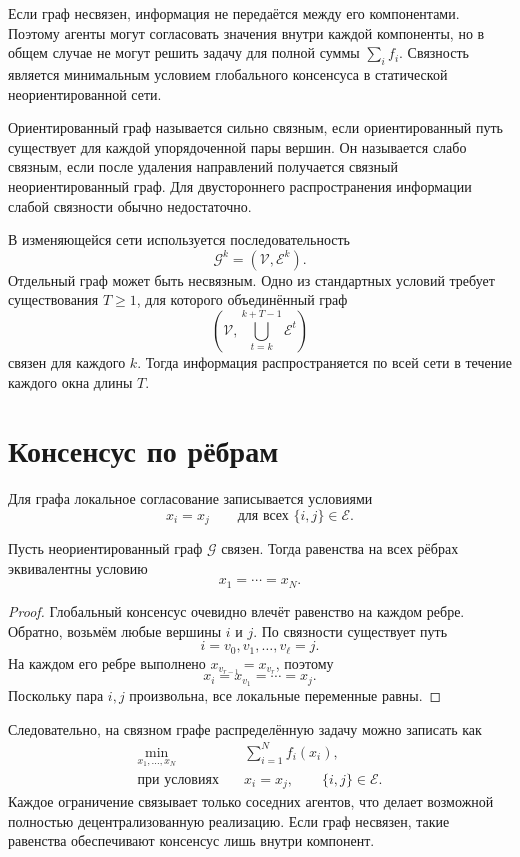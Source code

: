 Если граф несвязен, информация не передаётся между его компонентами.
Поэтому агенты могут согласовать значения внутри каждой компоненты,
но в общем случае не могут решить задачу для полной суммы
\(\sum_i f_i\). Связность является минимальным условием глобального
консенсуса в статической неориентированной сети.

Ориентированный граф называется сильно связным, если ориентированный
путь существует для каждой упорядоченной пары вершин. Он называется
слабо связным, если после удаления направлений получается связный
неориентированный граф. Для двустороннего распространения информации
слабой связности обычно недостаточно.

В изменяющейся сети используется последовательность
\[
    \mathcal G^k=(\mathcal V,\mathcal E^k).
\]
Отдельный граф может быть несвязным. Одно из стандартных условий
требует существования \(T\ge1\), для которого объединённый граф
\[
    \left(
        \mathcal V,
        \bigcup_{t=k}^{k+T-1}\mathcal E^t
    \right)
\]
связен для каждого \(k\). Тогда информация распространяется по всей
сети в течение каждого окна длины \(T\).

\section{Консенсус по рёбрам}

Для графа локальное согласование записывается условиями
\[
    x_i=x_j
    \qquad
    \text{для всех }\{i,j\}\in\mathcal E.
\]

\begin{theorem}
Пусть неориентированный граф \(\mathcal G\) связен. Тогда равенства
на всех рёбрах эквивалентны условию
\[
    x_1=\cdots=x_N.
\]
\end{theorem}

\begin{proof}
Глобальный консенсус очевидно влечёт равенство на каждом ребре.
Обратно, возьмём любые вершины \(i\) и \(j\). По связности существует
путь
\[
    i=v_0,v_1,\ldots,v_\ell=j.
\]
На каждом его ребре выполнено
\(x_{v_{r-1}}=x_{v_r}\), поэтому
\[
    x_i=x_{v_1}=\cdots=x_j.
\]
Поскольку пара \(i,j\) произвольна, все локальные переменные равны.
\end{proof}

Следовательно, на связном графе распределённую задачу можно записать
как
\[
\begin{aligned}
    \min_{x_1,\ldots,x_N}\quad
    &\sum_{i=1}^{N}f_i(x_i),
    \\
    \text{при условиях}\quad
    &x_i=x_j,
    \qquad
    \{i,j\}\in\mathcal E.
\end{aligned}
\]
Каждое ограничение связывает только соседних агентов, что делает
возможной полностью децентрализованную реализацию. Если граф несвязен,
такие равенства обеспечивают консенсус лишь внутри компонент.

